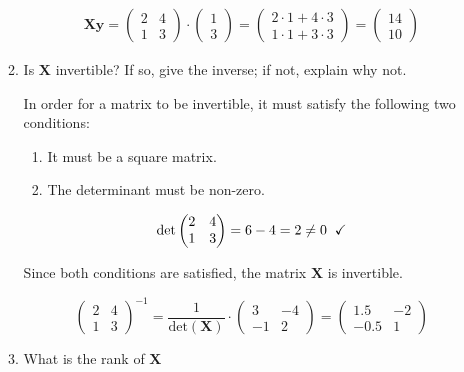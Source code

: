 \documentclass[letterpaper]{article}
\theoremstyle{definition}
\begin{document}
\begin{enumerate}
\begin{enumerate}
\begin{align*}
\mathbf{Xy} = \begin{pmatrix}2 & 4 \\ 1 & 3\end{pmatrix} \cdot \begin{pmatrix}1 \\ 3\end{pmatrix}
= \begin{pmatrix}2 \cdot 1 + 4 \cdot 3 \\ 1 \cdot 1 + 3 \cdot 3 \end{pmatrix}
= \begin{pmatrix}14 \\ 10\end{pmatrix}
\end{align*}

\color{black}

\item Is \(\mathbf{X}\) invertible? If so, give the inverse; if not, explain why not.

\color{teal}
In order for a matrix to be invertible, it must satisfy the following two conditions:
\begin{enumerate}
\item It must be a square matrix.
\item The determinant must be non-zero.
\end{enumerate}

$$\text{det}\begin{pmatrix}2 & 4 \\ 1 & 3\end{pmatrix} = 6 - 4 = 2 \ne 0 \hspace{.2cm} \checkmark$$

Since both conditions are satisfied, the matrix \(\mathbf{X}\) is invertible.

$$\begin{pmatrix}2 & 4 \\ 1 & 3\end{pmatrix}^{-1} = \frac{1}{\text{det}(\mathbf{X})} \cdot \begin{pmatrix}3 & -4 \\ -1 & 2\end{pmatrix} =
      \begin{pmatrix}1.5 & -2 \\ -0.5 & 1\end{pmatrix}$$

\color{black}

\item What is the rank of \(\mathbf{X}\)


\end{enumerate}
\end{enumerate}
\end{document}
